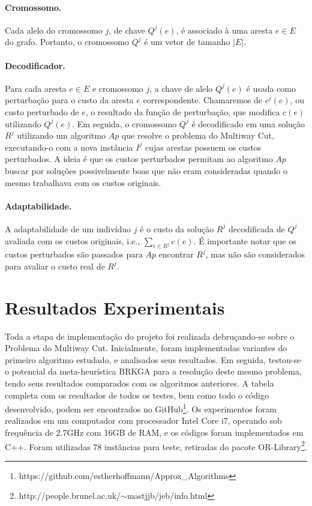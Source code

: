 \documentclass[12pt, a4paper]{article}
\begin{document}
\paragraph{Cromossomo.}
Cada alelo do cromossomo $j$, de chave $Q^j(e)$, é associado à uma aresta $e \in E$ do grafo. Portanto, o cromossomo $Q^j$ é um vetor de tamanho $|E|$.

\paragraph{Decodificador.}
Para cada aresta $e \in E$ e cromossomo $j$, a chave de alelo $Q^j(e)$ é usada como perturbação para o custo da aresta $e$ correspondente. Chamaremos de $c^j(e)$, ou custo perturbado de $e$, o resultado da função de perturbação, que modifica $c(e)$ utilizando $Q^j(e)$. Em seguida, o cromossomo $Q^j$ é decodificado em uma solução $R^j$ utilizando um algoritmo $Ap$ que resolve o problema do Multiway Cut, executando-o com a nova instância $I^j$ cujas arestas possuem os custos perturbados. A ideia é que os custos perturbados permitam ao algoritmo $Ap$ buscar por soluções possivelmente boas que não eram consideradas quando o mesmo trabalhava com os custos originais.

\paragraph{Adaptabilidade.}
A adaptabilidade de um indivíduo $j$ é o custo da solução $R^j$ decodificada de $Q^j$ avaliada com os custos originais, i.e., $\sum_{e \in R^j} c(e)$. É importante notar que os custos perturbados são passados para $Ap$ encontrar $R^j$, mas não são considerados para avaliar o custo real de $R^j$.


\section{Resultados Experimentais}\label{sec:implementation}
Toda a etapa de implementação do projeto foi realizada debruçando-se sobre o Problema do Multiway Cut. Inicialmente, foram implementadas variantes do primeiro algoritmo estudado, e analisados seus resultados. Em seguida, testou-se o potencial da meta-heurística BRKGA para a resolução deste mesmo problema, tendo seus resultados comparados com os algoritmos anteriores.
A tabela completa com os resultados de todos os testes, bem como todo o código desenvolvido, podem ser encontrados no GitHub\footnote{https://github.com/estherhoffmann/Approx\_Algorithms}. Os experimentos foram realizados em um computador com processador Intel Core i7, operando sob frequência de 2.7GHz com 16GB de RAM, e os códigos foram implementados em C++. Foram utilizadas 78 instâncias para teste, retiradas do pacote OR-Library\footnote{http://people.brunel.ac.uk/$\sim$mastjjb/jeb/info.html}.
\end{document}
